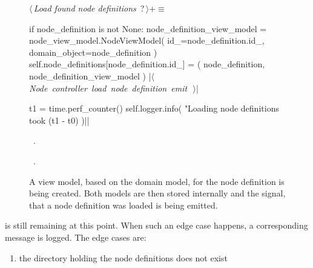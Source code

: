 \documentclass[%
    a4paper,    %
    justified,  %
    nobib,      %
    openany     %
]{tufte-book}
\begin{document}
\begin{figure}[!h]
  \begin{flushleft} \small
\begin{minipage}{\linewidth}\label{scrap8}\raggedright\small
{} $\langle\,${\itshape Load found node definitions}\nobreak\ {\footnotesize {?}}$\,\rangle+\equiv$
\vspace{-1ex}
\begin{pythoncode}
    if node_definition is not None:
        node_definition_view_model = node_view_model.NodeViewModel(
            id_=node_definition.id_,
            domain_object=node_definition
        )
        self.node_definitions[node_definition.id_] = (
            node_definition,
            node_definition_view_model
        )
        |\hbox{$\langle\,${\itshape Node controller load node definition emit}\nobreak\ {\footnotesize {}}$\,\rangle$}|

t1 = time.perf_counter()
self.logger.info(
    "Loading node definitions took %
    (t1 - t0)
)|\NWsep|
\end{pythoncode}
\vspace{1.5ex}
\footnotesize
\begin{list}{}{\setlength{\itemsep}{-\parsep}\setlength{\itemindent}{-\leftmargin}}
\item \NWtxtMacroDefBy\ .
\item \NWtxtMacroRefIn\ .

\item{}
\end{list}
\end{minipage}\vspace{4ex}
\end{flushleft}
\caption{A view model, based on the domain model, for the node definition is
    being created. Both models are then stored internally and the signal, that a
    node definition was loaded is being emitted.}
  \label{lst:nodes-controller-load-node-defs-2}
\end{figure}

\newpage{}

 is still remaining at this
point. When such an edge case happens, a corresponding message is logged. The
edge cases are:

\begin{enumerate}
  \item the directory holding the node definitions does not exist
\end{enumerate}
\end{document}
